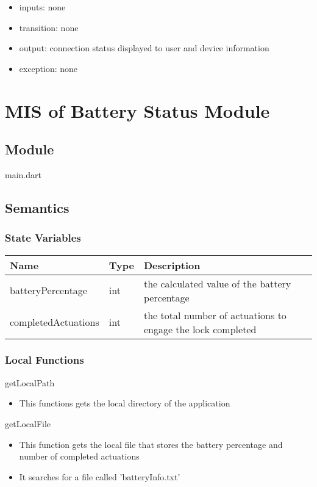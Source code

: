 \documentclass[12pt, titlepage]{article}
\begin{document}
\begin{itemize}
\item inputs: none
\item transition: none
\item output: connection status displayed to user and device information
\item exception: none
\end{itemize}

\section{MIS of Battery Status Module} \label{mHD}

\subsection{Module}
main.dart

\subsection{Semantics}

\subsubsection{State Variables}

\begin{center}
\begin{tabular}{p{4cm} p{4cm} p{6cm}}
\hline
\textbf{Name} & \textbf{Type} & \textbf{Description} \\
\hline
batteryPercentage & int & the calculated value of the battery percentage \\
completedActuations & int & the total number of actuations to engage the lock completed \\
\hline
\end{tabular}
\end{center}

\subsubsection{Local Functions}

\noindent getLocalPath
\begin{itemize}
\item This functions gets the local directory of the application
\end{itemize}

\noindent getLocalFile
\begin{itemize}
\item This function gets the local file that stores the battery percentage and number of completed actuations 
\item It searches for a file called 'batteryInfo.txt'
\end{itemize}
\end{document}
